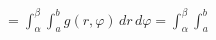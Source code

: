 \documentclass[preview]{standalone}
\begin{document}
\begin{align*}
&= \int_{\alpha}^{\beta} \int_{a}^{b} g(r, \varphi)\, dr\, d\varphi = \int_{\alpha}^{\beta} \int_{a}^{b}
\end{align*}
\end{document}
